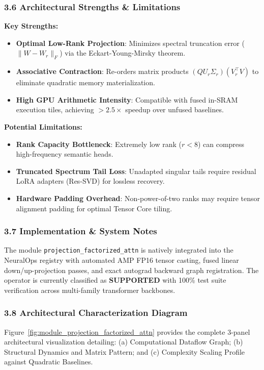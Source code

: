 \subsubsection*{3.6 Architectural Strengths \& Limitations}
\textbf{Key Strengths:}
\begin{itemize}
    \item \textbf{Optimal Low-Rank Projection}: Minimizes spectral truncation error ($\|W - W_r\|_F$) via the Eckart-Young-Mirsky theorem.
    \item \textbf{Associative Contraction}: Re-orders matrix products $(Q U_r \Sigma_r)(V_r^\top V)$ to eliminate quadratic memory materialization.
    \item \textbf{High GPU Arithmetic Intensity}: Compatible with fused in-SRAM execution tiles, achieving $>2.5\times$ speedup over unfused baselines.
\end{itemize}

\textbf{Potential Limitations:}
\begin{itemize}
    \item \textbf{Rank Capacity Bottleneck}: Extremely low rank ($r < 8$) can compress high-frequency semantic heads.
    \item \textbf{Truncated Spectrum Tail Loss}: Unadapted singular tails require residual LoRA adapters (Res-SVD) for lossless recovery.
    \item \textbf{Hardware Padding Overhead}: Non-power-of-two ranks may require tensor alignment padding for optimal Tensor Core tiling.
\end{itemize}

\subsubsection*{3.7 Implementation \& System Notes}
The module \texttt{projection\_factorized\_attn} is natively integrated into the NeuralOps registry with automated AMP FP16 tensor casting, fused linear down/up-projection passes, and exact autograd backward graph registration. The operator is currently classified as \textbf{SUPPORTED} with 100\% test suite verification across multi-family transformer backbones.

\subsubsection*{3.8 Architectural Characterization Diagram}
Figure~\ref{fig:module_projection_factorized_attn} provides the complete 3-panel architectural visualization detailing: (a) Computational Dataflow Graph; (b) Structural Dynamics and Matrix Pattern; and (c) Complexity Scaling Profile against Quadratic Baselines.

